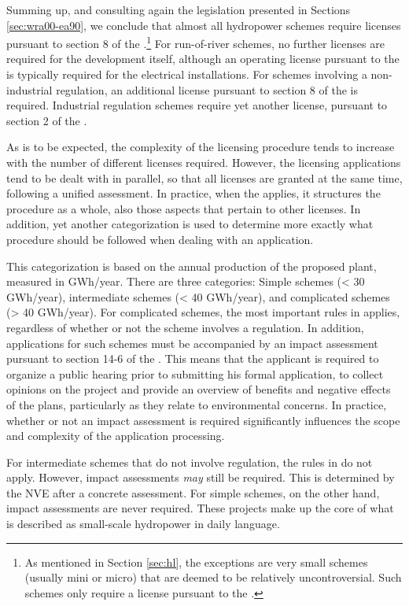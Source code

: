 Summing up, and consulting again the legislation presented in Sections \ref{sec:wra00-ea90}, we conclude that almost all hydropower schemes require licenses pursuant to section 8 of the \cite{wra00}.\footnote{As mentioned in Section \ref{sec:hl}, the exceptions are very small schemes (usually mini or micro) that are deemed to be relatively uncontroversial. Such schemes only require a license pursuant to the \cite{pb08}.} For run-of-river schemes, no further licenses are required for the development itself, although an operating license pursuant to the \cite{ea90} is typically required for the electrical installations. For schemes involving a non-industrial regulation, an additional license pursuant to section 8 of the \cite{wra17} is required. Industrial regulation schemes require yet another license, pursuant to section 2 of the \cite{ica17}.

As is to be expected, the complexity of the licensing procedure tends to increase with the number of different licenses required. However, the licensing applications tend to be dealt with in parallel, so that all licenses are granted at the same time, following a unified assessment. In practice, when the \cite{wra17} applies, it structures the procedure as a whole, also those aspects that pertain to other licenses. In addition, yet another categorization is used to determine more exactly what procedure should be followed when dealing with an application.

This categorization is based on the annual production of the proposed plant, measured in GWh/year. There are three categories: Simple schemes (< 30 GWh/year), intermediate schemes (< 40 GWh/year), and complicated schemes (> 40 GWh/year). For complicated schemes, the most important rules in \cite{wra17} applies, regardless of whether or not the scheme involves a regulation. In addition, applications for such schemes must be accompanied by an impact assessment pursuant to section 14-6 of the \cite{pb08}. This means that the applicant is required to organize a public hearing prior to submitting his formal application, to collect opinions on the project and provide an overview of benefits and negative effects of the plans, particularly as they relate to environmental concerns. In practice, whether or not an impact assessment is required significantly influences the scope and complexity of the application processing.

For intermediate schemes that do not involve regulation, the rules in \cite{wra17} do not apply. However, impact assessments {\it may} still be required. This is determined by the NVE after a concrete assessment. For simple schemes, on the other hand, impact assessments are never required. These projects make up the core of what is described as small-scale hydropower in daily language.

